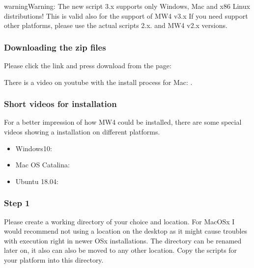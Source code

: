 \documentclass[a4paper,10pt,english]{sphinxmanual}
\begin{document}
\begin{sphinxadmonition}{warning}{Warning:}
\sphinxAtStartPar
The new script 3.x supports only Windows, Mac and x86 Linux distributions!
This is valid also for the support of MW4 v3.x
If you need support other platforms, please use the actual scripts 2.x. and
MW4 v2.x versions.
\end{sphinxadmonition}


\subsubsection{Downloading the zip files}
\label{\detokenize{install/mw4:downloading-the-zip-files}}
\sphinxAtStartPar
Please click the link and press download from the page:


\sphinxAtStartPar
There is a video on youtube with the install process for Mac:
.


\subsubsection{Short videos for installation}
\label{\detokenize{install/mw4:short-videos-for-installation}}
\sphinxAtStartPar
For a better impression of how MW4 could be installed, there are some special
videos showing a installation on different platforms.
\begin{multicols}{1}\raggedright
\begin{itemize}\setlength{\itemsep}{0pt}\setlength{\parskip}{0pt}
\item {} 
\sphinxAtStartPar
Windows10: 

\item {} 
\sphinxAtStartPar
Mac OS Catalina: 

\item {} 
\sphinxAtStartPar
Ubuntu 18.04: 

\end{itemize}\raggedcolumns\end{multicols}


\subsubsection{Step 1}
\label{\detokenize{install/mw4:step-1}}
\sphinxAtStartPar
Please create a working directory of your choice and location. For MacOSx I would
recommend not using a location on the desktop as it might cause troubles with
execution right in newer OSx installations. The directory can be renamed later on,
it also can also be moved to any other location. Copy the scripts for your
platform into this directory.
\end{document}
